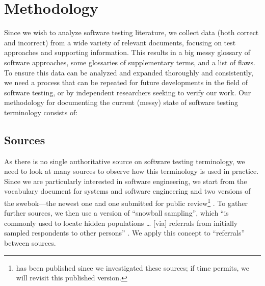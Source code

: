 \section{Methodology}\label{methodology}

Since we wish to analyze software testing literature, we collect data (both
correct and incorrect) from a wide variety of relevant documents, focusing on
test approaches and supporting information. This results in a big messy
glossary of software approaches, some glossaries of supplementary terms, and a
list of flaws. To ensure this data can be analyzed and expanded thoroughly and
consistently, we need a process that can be repeated for future developments in
the field of software testing, or by independent researchers seeking to verify
our work. Our methodology for documenting the current (messy) state of software
testing terminology consists of:



\subsection{Sources}\label{sources}
As there is no single authoritative source on software testing terminology,
we need to look at many sources to observe how this terminology is used in
practice. Since we are particularly interested in software engineering, we
start from the vocabulary document for systems and software engineering%
\citep{IEEE2017} and two versions of the \acf{swebok}---the newest
one \citep{SWEBOK2014} and one submitted for public review\footnote{
     \citep{SWEBOK2024} has been published since we investigated
    these sources; if time permits, we will revisit this published version.
} \citep{SWEBOK2024}. To gather further sources, we then use a version of
``snowball sampling'',
which ``is commonly used to locate hidden populations \dots{} [via] referrals
from initially sampled respondents to other persons'' \citep{Johnson2014}. We
apply this concept to ``referrals'' between sources. \addTextEx{}

